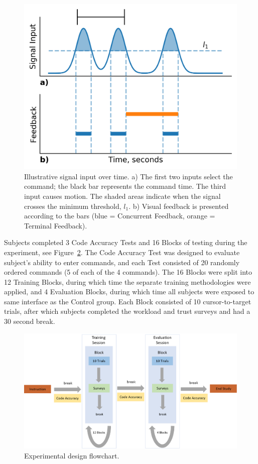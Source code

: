 \begin{figure}[bt!]
	\centering
	\includegraphics[width=.8\linewidth]{figures/EMG/Figure1}
	\caption[Illustrative signal input over time]{Illustrative signal input over time.
		a) The first two inputs select the command; the black bar represents the command time.
		The third input causes motion.
		The shaded areas indicate when the signal crosses the minimum threshold, $l_1$.
		b) Visual feedback is presented according to the bars (blue = Concurrent Feedback, orange = Terminal Feedback).}
	\label{figure:label1}
\end{figure}

Subjects completed 3 Code Accuracy Tests and 16 Blocks of testing during the experiment, see Figure~\ref{emg:experimentaldesign}.
The Code Accuracy Test was designed to evaluate subject's ability to enter commands, and each Test consisted of 20 randomly ordered commands (5 of each of the 4 commands).
The 16 Blocks were split into 12 Training Blocks, during which time the separate training methodologies were applied, and 4 Evaluation Blocks, during which time all subjects were exposed to same interface as the Control group.
Each Block consisted of 10 cursor-to-target trials, after which subjects completed the workload and trust surveys and had a 30 second break.

\begin{figure}[bt!]
	\centering
	\includegraphics[width=\linewidth]{figures/EMG/Figure3}
	\caption[Experimental design flowchart]{Experimental design flowchart.}
	\label{emg:experimentaldesign}
\end{figure}

